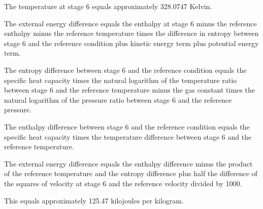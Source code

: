 The temperature at stage 6 equals approximately 328.0747 Kelvin.

The external energy difference equals the enthalpy at stage 6 minus the reference enthalpy minus the reference temperature times the difference in entropy between stage 6 and the reference condition plus kinetic energy term plus potential energy term.

The entropy difference between stage 6 and the reference condition equals the specific heat capacity times the natural logarithm of the temperature ratio between stage 6 and the reference temperature minus the gas constant times the natural logarithm of the pressure ratio between stage 6 and the reference pressure.

The enthalpy difference between stage 6 and the reference condition equals the specific heat capacity times the temperature difference between stage 6 and the reference temperature.

The external energy difference equals the enthalpy difference minus the product of the reference temperature and the entropy difference plus half the difference of the squares of velocity at stage 6 and the reference velocity divided by 1000.

This equals approximately 125.47 kilojoules per kilogram.
